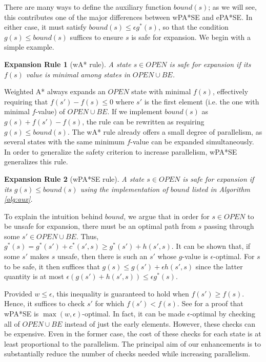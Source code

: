 \documentclass[letterpaper]{article}
\newtheorem{rul}{Expansion Rule}
\begin{document}
There are many ways to define the auxiliary function $bound(s)$; as we will see, this contributes one of the major differences between wPA*SE and ePA*SE. In either case, it must satisfy $bound(s) \le \epsilon g^*(s)$, so that the condition $g(s) \le bound(s)$ suffices to ensure $s$ is safe for expansion. We begin with a simple example.

\begin{rul}[wA* rule]
A state $s\in OPEN$ is safe for expansion if its $f(s)$ value is minimal among states in $OPEN\cup BE$.
\end{rul}

Weighted A* always expands an $OPEN$ state with minimal $f(s)$, effectively requiring that $f(s')-f(s)\le 0$ where $s'$ is the first element (i.e. the one with minimal $f$-value) of $OPEN\cup BE$. If we implement $bound(s)$ as $g(s) + f(s') - f(s)$, the rule can be rewritten as requiring $g(s) \le bound(s)$. The wA* rule already offers a small degree of parallelism, as several states with the same minimum $f$-value can be expanded simultaneously. In order to generalize the safety criterion to increase parallelism, wPA*SE generalizes this rule.

\begin{rul}[wPA*SE rule]
A state $s\in OPEN$ is safe for expansion if its $g(s) \le bound(s)$ using the implementation of $bound$ listed in Algorithm \ref{alg:aux}.
\end{rul}

To explain the intuition behind $bound$, we argue that in order for $s\in OPEN$ to be unsafe for expansion, there must be an optimal path from $s$ passing through some $s'\in OPEN\cup BE$. Thus, $g^*(s) = g^*(s') + c^*(s',s) \ge g^*(s') + h(s',s)$.   It can be shown that, if some $s'$ makes $s$ unsafe, then there is such an $s'$ whose $g$-value is $\epsilon$-optimal. For $s$ to be safe, it then suffices that $g(s) \le g(s') + \epsilon h(s', s)$ since the latter quantity is at most $\epsilon (g(s') + h(s',s)) \le \epsilon g^*(s)$.

Provided $w \le \epsilon$, this inequality is guaranteed to hold when $f(s') \ge f(s)$. Hence, it suffices to check $s'$ for which $f(s') < f(s)$. See \cite{} for a proof that wPA*SE is $\max(w, \epsilon)$-optimal. In fact, it can be made $\epsilon$-optimal by checking all of $OPEN\cup BE$ instead of just the early elements. However, these checks can be expensive. Even in the former case, the cost of these checks for each state is at least proportional to the parallelism. The principal aim of our enhancements is to substantially reduce the number of checks needed while increasing parallelism.
\end{document}
